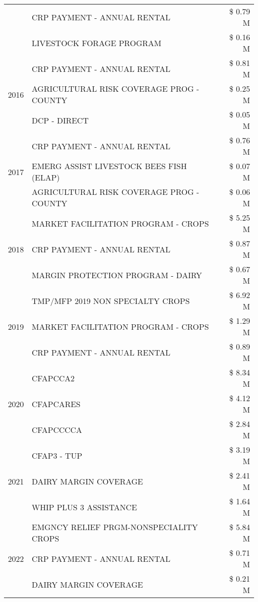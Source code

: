 \begin{tabular}{llr}
 & CRP PAYMENT - ANNUAL RENTAL & \$ 0.79 M \\
 & LIVESTOCK FORAGE PROGRAM & \$ 0.16 M \\
\cline{1-3}
\multirow[t]{3}{*}{2016} & CRP PAYMENT - ANNUAL RENTAL & \$ 0.81 M \\
 & AGRICULTURAL RISK COVERAGE PROG - COUNTY & \$ 0.25 M \\
 & DCP - DIRECT & \$ 0.05 M \\
\cline{1-3}
\multirow[t]{3}{*}{2017} & CRP PAYMENT - ANNUAL RENTAL & \$ 0.76 M \\
 & EMERG ASSIST LIVESTOCK BEES FISH (ELAP) & \$ 0.07 M \\
 & AGRICULTURAL RISK COVERAGE PROG - COUNTY & \$ 0.06 M \\
\cline{1-3}
\multirow[t]{3}{*}{2018} & MARKET FACILITATION PROGRAM - CROPS & \$ 5.25 M \\
 & CRP PAYMENT - ANNUAL RENTAL & \$ 0.87 M \\
 & MARGIN PROTECTION PROGRAM - DAIRY & \$ 0.67 M \\
\cline{1-3}
\multirow[t]{3}{*}{2019} & TMP/MFP 2019 NON SPECIALTY CROPS & \$ 6.92 M \\
 & MARKET FACILITATION PROGRAM - CROPS & \$ 1.29 M \\
 & CRP PAYMENT - ANNUAL RENTAL & \$ 0.89 M \\
\cline{1-3}
\multirow[t]{3}{*}{2020} & CFAPCCA2 & \$ 8.34 M \\
 & CFAPCARES & \$ 4.12 M \\
 & CFAPCCCCA & \$ 2.84 M \\
\cline{1-3}
\multirow[t]{3}{*}{2021} & CFAP3 - TUP & \$ 3.19 M \\
 & DAIRY MARGIN COVERAGE & \$ 2.41 M \\
 & WHIP PLUS 3 ASSISTANCE & \$ 1.64 M \\
\cline{1-3}
\multirow[t]{3}{*}{2022} & EMGNCY RELIEF PRGM-NONSPECIALITY CROPS & \$ 5.84 M \\
 & CRP PAYMENT - ANNUAL RENTAL & \$ 0.71 M \\
 & DAIRY MARGIN COVERAGE & \$ 0.21 M \\
\cline{1-3}
\bottomrule
\end{tabular}
